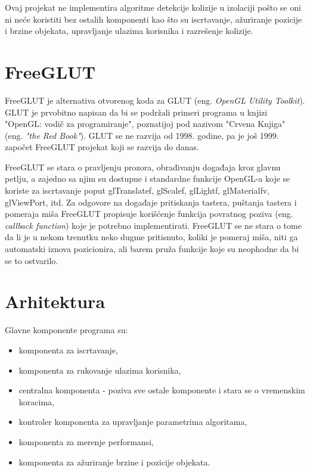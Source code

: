 \documentclass[12pt,oneside]{memoir}
\begin{document}
Ovaj projekat ne implementira algoritme detekcije kolizije u izolaciji pošto 
se oni ni neće koristiti bez ostalih komponenti kao što su iscrtavanje, ažuriranje pozicije i brzine objekata,
upravljanje ulazima korisnika i razrešenje kolizije.

\section{FreeGLUT}

FreeGLUT je alternativa otvorenog koda za GLUT (eng. {\em OpenGL Utility Toolkit}). 
GLUT je prvobitno napisan da bi se podržali primeri programa u knjizi "OpenGL:
vodič za programiranje", poznatijoj pod nazivom "Crvena Knjiga" (eng. {\em "the Red Book"}).
GLUT se ne razvija od 1998. godine, pa je još 1999. započet FreeGLUT projekat koji 
se razvija do danas. 
\cite{freeglut}

FreeGLUT se stara o pravljenju prozora, obrađivanju događaja kroz glavnu petlju,
a zajedno sa njim su dostupne i standardne funkcije OpenGL-a koje se koriste
za iscrtavanje poput glTranslatef, glScalef, glLightf, glMaterialfv, glViewPort, itd.
Za odgovore na događaje pritiskanja tastera, puštanja tastera i pomeraja miša
FreeGLUT propisuje korišćenje funkcija povratnog poziva  (eng. {\em callback function}) koje je potrebno implementirati.
FreeGLUT se ne stara o tome da li je u nekom trenutku neko dugme pritisnuto, 
koliki je pomeraj miša, niti ga automatski iznova pozicionira, ali barem pruža 
funkcije koje su neophodne da bi se to ostvarilo.

\section{Arhitektura}

Glavne komponente programa su:
\begin{itemize}
	\item komponenta za iscrtavanje,
	\item komponenta za rukovanje ulazima korisnika,
	\item centralna komponenta - poziva sve ostale komponente i stara se o vremenskim koracima,
	\item kontroler komponenta za upravljanje parametrima algoritama,
	\item komponenta za merenje performansi,
	\item komponenta za ažuriranje brzine i pozicije objekata.
\end{itemize}
\end{document}
